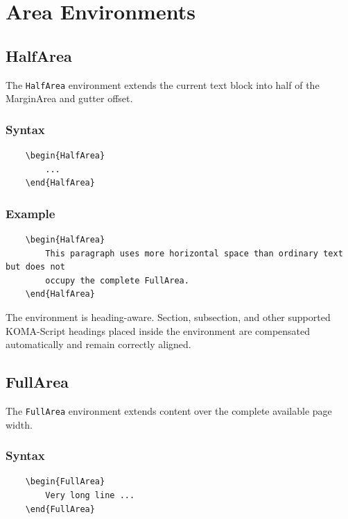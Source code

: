 \documentclass[
11pt,
a4paper,
oneside
]{scrbook}
\begin{document}
\chapter{Area Environments}
\label{chap:area-environments}

\section{HalfArea}

The \texttt{HalfArea} environment extends the current text block into half
of the MarginArea and gutter offset.

\subsection{Syntax}

\begin{verbatim}
	\begin{HalfArea}
		...
	\end{HalfArea}
\end{verbatim}

\subsection{Example}

\begin{HalfArea}
\begin{verbatim}
	\begin{HalfArea}
		This paragraph uses more horizontal space than ordinary text but does not
		occupy the complete FullArea.
	\end{HalfArea}
\end{verbatim}
\end{HalfArea}
The environment is heading-aware.
Section, subsection, and other supported KOMA-Script headings placed inside
the environment are compensated automatically and remain correctly aligned.

\section{FullArea}

The \texttt{FullArea} environment extends content over the complete available
page width.

\subsection{Syntax}

\begin{verbatim}
	\begin{FullArea}
		Very long line ...
	\end{FullArea}
\end{verbatim}
\end{document}
